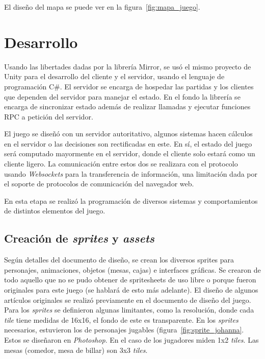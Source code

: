 El diseño del mapa se puede ver en la figura~\ref{fig:mapa_juego}.

\section{Desarrollo}
Usando las libertades dadas por la librería Mirror, se usó el mismo proyecto de Unity para el desarrollo del cliente y el servidor, usando el lenguaje de programación C\#. El servidor se encarga de hospedar las partidas y los clientes que dependen del servidor para manejar el estado. En el fondo la librería se encarga de sincronizar estado además de realizar llamadas y ejecutar funciones RPC a petición del servidor.

El juego se diseñó con un servidor autoritativo, algunos sistemas hacen cálculos en el servidor o las decisiones son rectificadas en este. En sí, el estado del juego será computado mayormente en el servidor, donde el cliente solo estará como un cliente ligero. La comunicación entre estos dos se realizara con el protocolo usando \textit{Websockets} para la transferencia de información, una limitación dada por el soporte de protocolos de comunicación del navegador web.

En esta etapa se realizó la programación de diversos sistemas y comportamientos de distintos elementos del juego.

\subsection{Creación de \textit{sprites} y \textit{assets}}
Según detalles del documento de diseño, se crean los diversos sprites para personajes, animaciones, objetos (mesas, cajas) e interfaces gráficas. Se crearon de todo aquello que no se pudo obtener de spritesheets de uso libre o porque fueron originales para este juego (se hablará de esto más adelante). El diseño de algunos artículos originales se realizó previamente en el documento de diseño del juego. Para los \textit{sprites} se definieron algunas limitantes, como la resolución, donde cada \textit{tile}  tiene medidas de 16x16, el fondo de este es transparente. En los \textit{sprites} necesarios, estuvieron los de personajes jugables (figura~\ref{fig:sprite_johanna}. Estos se diseñaron en \textit{Photoshop}. En el caso de los jugadores miden 1x2 \textit{tiles}. Las mesas (comedor, mesa de billar) son 3x3 \textit{tiles}. 

